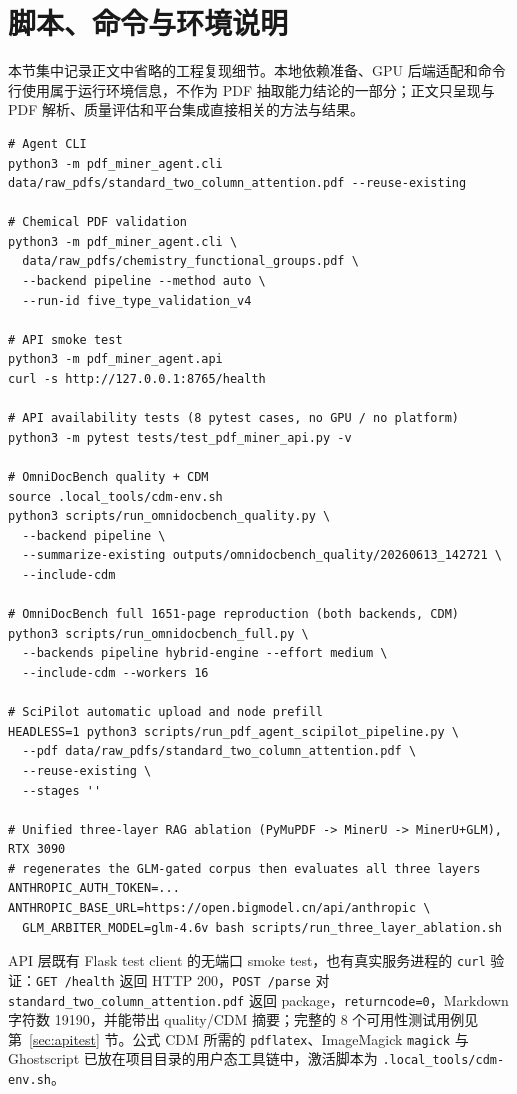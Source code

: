 \documentclass[UTF8,a4paper,11pt]{ctexart}
\begin{document}
\appendix
\section{脚本、命令与环境说明}

本节集中记录正文中省略的工程复现细节。本地依赖准备、GPU 后端适配和命令行使用属于运行环境信息，不作为 PDF 抽取能力结论的一部分；正文只呈现与 PDF 解析、质量评估和平台集成直接相关的方法与结果。

\begin{lstlisting}
# Agent CLI
python3 -m pdf_miner_agent.cli data/raw_pdfs/standard_two_column_attention.pdf --reuse-existing

# Chemical PDF validation
python3 -m pdf_miner_agent.cli \
  data/raw_pdfs/chemistry_functional_groups.pdf \
  --backend pipeline --method auto \
  --run-id five_type_validation_v4

# API smoke test
python3 -m pdf_miner_agent.api
curl -s http://127.0.0.1:8765/health

# API availability tests (8 pytest cases, no GPU / no platform)
python3 -m pytest tests/test_pdf_miner_api.py -v

# OmniDocBench quality + CDM
source .local_tools/cdm-env.sh
python3 scripts/run_omnidocbench_quality.py \
  --backend pipeline \
  --summarize-existing outputs/omnidocbench_quality/20260613_142721 \
  --include-cdm

# OmniDocBench full 1651-page reproduction (both backends, CDM)
python3 scripts/run_omnidocbench_full.py \
  --backends pipeline hybrid-engine --effort medium \
  --include-cdm --workers 16

# SciPilot automatic upload and node prefill
HEADLESS=1 python3 scripts/run_pdf_agent_scipilot_pipeline.py \
  --pdf data/raw_pdfs/standard_two_column_attention.pdf \
  --reuse-existing \
  --stages ''

# Unified three-layer RAG ablation (PyMuPDF -> MinerU -> MinerU+GLM), RTX 3090
# regenerates the GLM-gated corpus then evaluates all three layers
ANTHROPIC_AUTH_TOKEN=... ANTHROPIC_BASE_URL=https://open.bigmodel.cn/api/anthropic \
  GLM_ARBITER_MODEL=glm-4.6v bash scripts/run_three_layer_ablation.sh
\end{lstlisting}

API 层既有 Flask test client 的无端口 smoke test，也有真实服务进程的 \texttt{curl} 验证：\texttt{GET /health} 返回 HTTP 200，\texttt{POST /parse} 对 \texttt{standard\_two\_column\_attention.pdf} 返回 package，\texttt{returncode=0}，Markdown 字符数 19190，并能带出 quality/CDM 摘要；完整的 8 个可用性测试用例见第~\ref{sec:apitest} 节。公式 CDM 所需的 \texttt{pdflatex}、ImageMagick \texttt{magick} 与 Ghostscript 已放在项目目录的用户态工具链中，激活脚本为 \texttt{.local\_tools/cdm-env.sh}。
\end{document}
